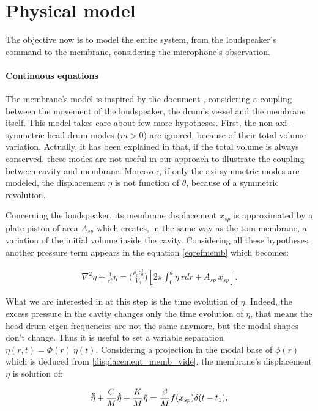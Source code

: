 \documentclass[11pt, twocolumn]{article}
\begin{document}
\section{Physical model}\label{physical_model}

The objective now is to model the entire system, from the loudspeaker's command to the membrane, considering the microphone's observation.
\paragraph{Continuous equations}
The membrane's model is inspired by the document \cite{morse1995vibration}, considering a coupling between the movement of the loudspeaker, the drum's vessel and the membrane itself. This model takes care about few more hypotheses. First, the non axi-symmetric head drum modes ($m > 0$) are ignored, because of their total volume variation. Actually, it has been explained in \cite{morse1995vibration} that, if the total volume is always conserved, these modes are not useful in our approach to illustrate the coupling between cavity and membrane. Moreover, if only the axi-symmetric modes are modeled, the displacement $\eta$ is not function of $\theta$, because of a symmetric revolution.

Concerning the loudspeaker, its membrane displacement $x_{sp}$ is approximated by a plate piston of area $A_{sp}$ which creates, in the same way as the tom membrane, a variation of the initial volume inside the cavity.  Considering all these hypotheses, another pressure term appears in the equation \eqref{eqrefmemb} which becomes:

\begin{align}
    \nabla^2 \eta +\frac{1}{c^2}\ddot \eta = \Bigg(\frac{\rho_0c_a^2}{V_0}\Bigg)  \left[ 2 \pi \int^{a}_{0} \eta \: rdr +
    A_{sp} \: x_{sp}       \right].
\end{align}

\noindent
What we are interested in at this step is the time evolution of $\eta$. Indeed, the excess pressure in the cavity changes only the time evolution of $\eta$, that means the head drum eigen-frequencies are not the same anymore, but the modal shapes don't change. Thus it is useful to set a variable separation $\eta(r,t) = \Phi (r) \: \tilde{\eta}(t)  $. Considering a projection in the modal base of $\phi(r)$ which is deduced from \eqref{displacement_memb_vide}, the membrane's displacement $\tilde{\eta}$ is solution of:

\begin{align}
    \Ddot{\Tilde{\eta}} + \frac{C}{M} \Dot{\Tilde{\eta}} + \frac{K}{M} \Tilde{\eta} = \frac{\beta}{M} f(x_{sp})\delta(t - t_1),
    \label{equ_displa_modal}
\end{align}
\end{document}
